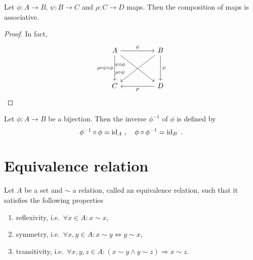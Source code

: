     \begin{theorem}
        Let $\phi \colon A \rightarrow B$, $\psi \colon B \rightarrow C$ and $\rho \colon C \rightarrow D$ maps. Then the composition of maps is associative.
    \end{theorem}
    \begin{proof}
        In fact,
        \begin{equation*}
            \begin{tikzcd}[column sep=huge, row sep=huge]
                A 
                \arrow{r}[yshift=0cm]{\phi} 
                \arrow{d}[swap]{\rho \circ \psi \circ \phi}
                \arrow{dr}[xshift=-1.2cm]{\psi \circ \phi}
                & B 
                \arrow{d}[xshift=0cm]{\psi} 
                \arrow{dl}[xshift=-1.2cm]{\rho \circ \psi} \\
                C 
                & D 
                \arrow{l}[xshift=0cm]{\rho}
            \end{tikzcd}
        \end{equation*}
    \end{proof}

    \begin{definition}
        Let $\phi \colon A \rightarrow B$ be a bijection. Then the inverse $\phi^{-1}$ of $\phi$ is defined by 
        \begin{equation*}
            \phi^{-1} \circ \phi = \operatorname{id}_A ~, \quad \phi \circ \phi^{-1} = \operatorname{id}_B ~.
        \end{equation*}
    \end{definition}

\section{Equivalence relation}

    \begin{definition}
        Let $A$ be a set and $\sim$ a relation, called an equivalence relation, such that it satisfies the following properties
        \begin{enumerate}
            \item reflexivity, i.e.~$\forall x \in A \colon x \sim x$,
            \item symmetry, i.e.~$\forall x,y \in A \colon x \sim y \Leftrightarrow y \sim x$,
            \item transitivity, i.e.~$\forall x,y,z \in A \colon (x \sim y \land y \sim z) \Rightarrow x \sim z$.
        \end{enumerate}
    \end{definition}

